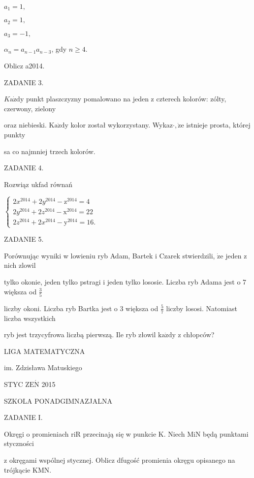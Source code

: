 \documentclass[a4paper,12pt]{article}
\begin{document}
$a_{1}=1,$

$a_{2}=1,$

$a_{3}=-1,$

$\alpha_{n}=a_{n-1}a_{n-3}$, gdy $n\geq 4.$

Oblicz a2014.

ZADANIE 3.

$K\mathrm{a}\dot{\mathrm{z}}\mathrm{d}\mathrm{y}$ punkt plaszczyzny pomalowano na jeden z czterech kolorów: zólty, czerwony, zielony

oraz niebieski. $\mathrm{K}\mathrm{a}\dot{\mathrm{z}}\mathrm{d}\mathrm{y}$ kolor został wykorzystany. Wykaz$\cdot, \dot{\mathrm{z}}\mathrm{e}$ istnieje prosta, której punkty

sa co najmniej trzech kolorów.

ZADANIE 4.

Rozwiąz ukfad równań

$\left\{\begin{array}{l}
2x^{2014}+2y^{2014}-\mathrm{z}^{2014}=4\\
2y^{2014}+2z^{2014}-\mathrm{x}^{2014}=22\\
2z^{2014}+2x^{2014}-\mathrm{y}^{2014}=16.
\end{array}\right.$

ZADANIE 5.

Porównując wyniki w lowieniu ryb Adam, Bartek i Czarek stwierdzili, $\dot{\mathrm{z}}\mathrm{e}$ jeden z nich zlowil

tylko okonie, jeden tylko pstragi i jeden tylko lososie. Liczba ryb Adama jest o 7 większa od $\displaystyle \frac{3}{5}$

liczby okoni. Liczba ryb Bartka jest o 3 większa od $\displaystyle \frac{5}{7}$ liczby lososi. Natomiast liczba wszystkich

ryb jest trzycyfrowa liczbą pierwszą. Ile ryb złowil $\mathrm{k}\mathrm{a}\dot{\mathrm{z}}\mathrm{d}\mathrm{y}$ z chłopców?






LIGA MATEMATYCZNA

im. Zdzisława Matuskiego

STYC Z$\mathrm{E}\acute{\mathrm{N}}$ 2015

SZKOLA PONADGIMNAZJALNA

ZADANIE I.

Okręgi o promieniach riR przecinają się w punkcie K. Niech MiN będą punktami styczności

z okręgami wspólnej stycznej. Oblicz dfugość promienia okręgu opisanego na trójkącie KMN.
\end{document}
